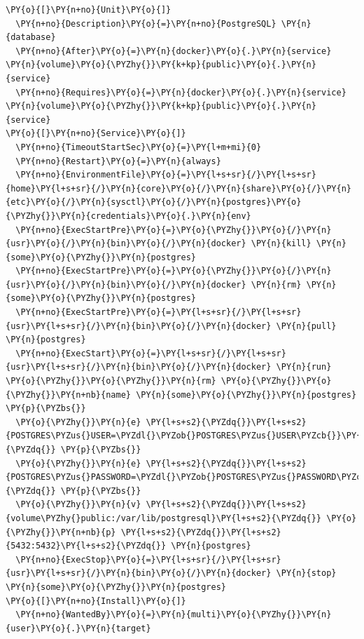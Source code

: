 \begin{codelisting}
\label{code:postgresql.service}
\begin{Verbatim}[fontsize=\relsize{-2.5},fontseries=b,commandchars=\\\{\}]
\PY{o}{[}\PY{n+no}{Unit}\PY{o}{]} 
  \PY{n+no}{Description}\PY{o}{=}\PY{n+no}{PostgreSQL} \PY{n}{database} 
  \PY{n+no}{After}\PY{o}{=}\PY{n}{docker}\PY{o}{.}\PY{n}{service} \PY{n}{volume}\PY{o}{\PYZhy{}}\PY{k+kp}{public}\PY{o}{.}\PY{n}{service}
  \PY{n+no}{Requires}\PY{o}{=}\PY{n}{docker}\PY{o}{.}\PY{n}{service} \PY{n}{volume}\PY{o}{\PYZhy{}}\PY{k+kp}{public}\PY{o}{.}\PY{n}{service}
\PY{o}{[}\PY{n+no}{Service}\PY{o}{]} 
  \PY{n+no}{TimeoutStartSec}\PY{o}{=}\PY{l+m+mi}{0}
  \PY{n+no}{Restart}\PY{o}{=}\PY{n}{always}
  \PY{n+no}{EnvironmentFile}\PY{o}{=}\PY{l+s+sr}{/}\PY{l+s+sr}{home}\PY{l+s+sr}{/}\PY{n}{core}\PY{o}{/}\PY{n}{share}\PY{o}{/}\PY{n}{etc}\PY{o}{/}\PY{n}{sysctl}\PY{o}{/}\PY{n}{postgres}\PY{o}{\PYZhy{}}\PY{n}{credentials}\PY{o}{.}\PY{n}{env}
  \PY{n+no}{ExecStartPre}\PY{o}{=}\PY{o}{\PYZhy{}}\PY{o}{/}\PY{n}{usr}\PY{o}{/}\PY{n}{bin}\PY{o}{/}\PY{n}{docker} \PY{n}{kill} \PY{n}{some}\PY{o}{\PYZhy{}}\PY{n}{postgres} 
  \PY{n+no}{ExecStartPre}\PY{o}{=}\PY{o}{\PYZhy{}}\PY{o}{/}\PY{n}{usr}\PY{o}{/}\PY{n}{bin}\PY{o}{/}\PY{n}{docker} \PY{n}{rm} \PY{n}{some}\PY{o}{\PYZhy{}}\PY{n}{postgres} 
  \PY{n+no}{ExecStartPre}\PY{o}{=}\PY{l+s+sr}{/}\PY{l+s+sr}{usr}\PY{l+s+sr}{/}\PY{n}{bin}\PY{o}{/}\PY{n}{docker} \PY{n}{pull} \PY{n}{postgres} 
  \PY{n+no}{ExecStart}\PY{o}{=}\PY{l+s+sr}{/}\PY{l+s+sr}{usr}\PY{l+s+sr}{/}\PY{n}{bin}\PY{o}{/}\PY{n}{docker} \PY{n}{run} \PY{o}{\PYZhy{}}\PY{o}{\PYZhy{}}\PY{n}{rm} \PY{o}{\PYZhy{}}\PY{o}{\PYZhy{}}\PY{n+nb}{name} \PY{n}{some}\PY{o}{\PYZhy{}}\PY{n}{postgres} \PY{p}{\PYZbs{}}
  \PY{o}{\PYZhy{}}\PY{n}{e} \PY{l+s+s2}{\PYZdq{}}\PY{l+s+s2}{POSTGRES\PYZus{}USER=\PYZdl{}\PYZob{}POSTGRES\PYZus{}USER\PYZcb{}}\PY{l+s+s2}{\PYZdq{}} \PY{p}{\PYZbs{}}
  \PY{o}{\PYZhy{}}\PY{n}{e} \PY{l+s+s2}{\PYZdq{}}\PY{l+s+s2}{POSTGRES\PYZus{}PASSWORD=\PYZdl{}\PYZob{}POSTGRES\PYZus{}PASSWORD\PYZcb{}}\PY{l+s+s2}{\PYZdq{}} \PY{p}{\PYZbs{}}
  \PY{o}{\PYZhy{}}\PY{n}{v} \PY{l+s+s2}{\PYZdq{}}\PY{l+s+s2}{volume\PYZhy{}public:/var/lib/postgresql}\PY{l+s+s2}{\PYZdq{}} \PY{o}{\PYZhy{}}\PY{n+nb}{p} \PY{l+s+s2}{\PYZdq{}}\PY{l+s+s2}{5432:5432}\PY{l+s+s2}{\PYZdq{}} \PY{n}{postgres} 
  \PY{n+no}{ExecStop}\PY{o}{=}\PY{l+s+sr}{/}\PY{l+s+sr}{usr}\PY{l+s+sr}{/}\PY{n}{bin}\PY{o}{/}\PY{n}{docker} \PY{n}{stop} \PY{n}{some}\PY{o}{\PYZhy{}}\PY{n}{postgres} 
\PY{o}{[}\PY{n+no}{Install}\PY{o}{]} 
  \PY{n+no}{WantedBy}\PY{o}{=}\PY{n}{multi}\PY{o}{\PYZhy{}}\PY{n}{user}\PY{o}{.}\PY{n}{target}
\end{Verbatim}
\end{codelisting}

